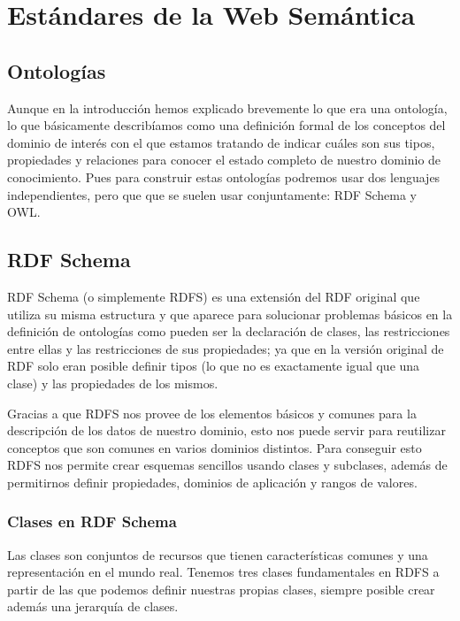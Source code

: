 \chapter{Estándares de la Web Semántica}

\section{Ontologías}
Aunque en la introducción hemos explicado brevemente lo que era una ontología, lo que básicamente describíamos como una definición formal de los conceptos del dominio de interés con el que estamos tratando de indicar cuáles son sus tipos, propiedades y relaciones para conocer el estado completo de nuestro dominio de conocimiento. Pues para construir estas ontologías podremos usar dos lenguajes independientes, pero que que se suelen usar conjuntamente: {\sf RDF Schema} y {\sf OWL}.

\section{RDF Schema}
{\sf RDF Schema} (o simplemente {\sf RDFS}) es una extensión del {\sf RDF} original que utiliza su misma estructura y que aparece para solucionar problemas básicos en la definición de ontologías como pueden ser la declaración de clases, las restricciones entre ellas y las restricciones de sus propiedades; ya que en la versión original de {\sf RDF} solo eran posible definir tipos (lo que no es exactamente igual que una clase) y las propiedades de los mismos.

\bigskip
Gracias a que {\sf RDFS} nos provee de los elementos básicos y comunes para la descripción de los datos de nuestro dominio, esto nos puede servir para reutilizar conceptos que son comunes en varios dominios distintos. Para conseguir esto {\sf RDFS} nos permite crear esquemas sencillos usando clases y subclases, además de permitirnos definir propiedades, dominios de aplicación y rangos de valores.

\newpage
\subsection{Clases en RDF Schema}
Las clases son conjuntos de recursos que tienen características comunes y una representación en el mundo real. Tenemos tres clases fundamentales en {\sf RDFS} a partir de las que podemos definir nuestras propias clases, siempre posible crear además una jerarquía de clases.


